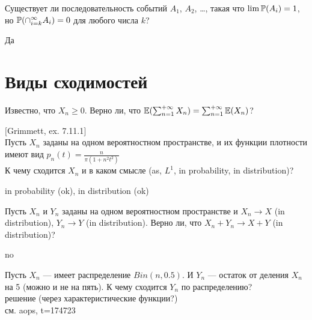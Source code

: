 \begin{problem}
Существует ли последовательность событий $A_1$, $A_2$, \ldots, такая что $\lim \P(A_i)=1$, но $\P(\cap_{i=k}^{\infty} A_i)=0$ для любого числа $k$?

\begin{sol}
Да
\end{sol}
\end{problem}


\section{Виды сходимостей}

\begin{problem}
Известно, что $X_{n} \ge 0$. Верно ли, что
$\E(\sum_{n=1}^{+\infty}X_{n})=\sum_{n=1}^{+\infty}\E(X_{n})$?

\begin{sol}

\end{sol}
\end{problem}

\begin{problem}
$[$Grimmett, ex. 7.11.1$]$ \\
Пусть $X_{n}$ заданы на одном вероятностном пространстве, и их
функции плотности имеют вид
$p_{n}(t)=\frac{n}{\pi(1+n^{2}t^{2})}$ \\
К чему сходится $X_{n}$ и в каком смысле (as, $L^{1}$, in
probability, in distribution)?

\begin{sol}

in probability (ok), in distribution (ok)
\end{sol}
\end{problem}

\begin{problem}
Пусть $X_{n}$ и $Y_{n}$ заданы на одном вероятностном пространстве
и $X_{n}\rightarrow X$ (in distribution), $Y_{n}\rightarrow Y$ (in
distribution). Верно ли, что $X_{n}+Y_{n}\rightarrow X+Y$ (in
distribution)?

\begin{sol}
no
\end{sol}
\end{problem}

\begin{problem}
Пусть $X_{n}$ — имеет распределение $Bin(n,0.5)$. И $Y_{n}$ — остаток от деления $X_{n}$ на 5 (можно и не на пять). К чему сходится $Y_{n}$ по распределению? \\
решение (через характеристические функции?) \\
см. aops, t=174723

\begin{sol}

\end{sol}
\end{problem}

